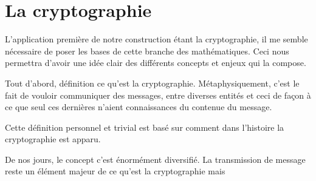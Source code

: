 \section{La cryptographie}
L'application première de notre construction étant la cryptographie, il me semble nécessaire de
poser les bases de cette branche des mathématiques. Ceci nous permettra d'avoir une idée clair
des différents concepts et enjeux qui la compose.

Tout d'abord, définition ce qu'est la cryptographie. Métaphysiquement, c'est le fait de vouloir
communiquer des messages, entre diverses entités et ceci de façon à ce que seul ces dernières
n'aient connaissances du contenue du message.

Cette définition personnel et trivial est basé sur comment dans l'histoire la cryptographie est
apparu.

De nos jours, le concept c'est énormément diversifié. La transmission de message reste un élément
majeur de ce qu'est la cryptographie mais 
